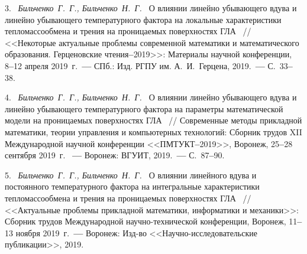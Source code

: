 3.~%
\textit%
{Бильченко~Г.~Г.,  
 Бильченко~Н.~Г.~}  
{%
  {О  влиянии  
линейно  убывающего 
вдува  и  
линейно  убывающего 
температурного  фактора  
на  локальные  характеристики  
тепломассообмена  и 	трения  
на  проницаемых  поверхностях  ГЛА}%
~/$\!$/  
  <<Некоторые  актуальные  проблемы  
  современной  математики 
  и  математического  образования. 
    Герценовские  чтения{\textbf{--}}2019>>: 
  Материалы  научной  конференции, 
  8{\textbf{--}}12  
  апреля  2019~г.~{\textbf{---}} 
  СПб.:  Изд.  \mbox{РГПУ}  им.  А.~И.~Герцена, 
  2019.~{\textbf{---}} 
  С.~33{\textbf{--}}38.%
  }



4.~%
\textit%
{Бильченко~Г.~Г., 
 Бильченко~Н.~Г.~}  
{%
  {О  влиянии  
линейно  убывающего 
вдува  и  
линейно  убывающего 
температурного  фактора  
на  параметры  математической  модели  
на  проницаемых  поверхностях  ГЛА}%
~/$\!$/  
  Современные  методы  прикладной  математики, 
  теории  управления  и  компьютерных  технологий: 
  Сборник  трудов 
  XII  Международной  научной  
  конференции 
  <<\mbox{ПМТУКТ}{\textbf{--}}2019>>, 
  Воронеж, 
  25{\textbf{--}}28  
  сентября  2019~г.%
~{\textbf{---}} 
  Воронеж:  ВГУИТ, 
  2019.~{\textbf{---}} 
  С.~87{\textbf{--}}90.%
  }



5.~%
\textit%
{Бильченко~Г.~Г.,  
 Бильченко~Н.~Г.~}  
{%
  {О  влиянии  линейного  вдува 
и  постоянного  температурного  фактора 
на  интегральные  характеристики  тепломассообмена  
и  трения 
на  проницаемых  поверхностях 
ГЛА}%
~/$\!$/  
  <<Актуальные  проблемы  
   прикладной  математики,  информатики  
   и  механики>>:  
  Сборник  трудов  Международной  
  научно-технической  конференции,  
  Воронеж,  
  11{\textbf{--}}13  
  ноября  2019~г.~{\textbf{---}}  
  Воронеж:  
  Изд-во  <<На\-уч\-но-исследовательские  публикации>>,  
  2019.%
  }



